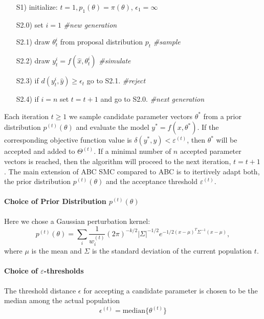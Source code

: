 \documentclass[10pt,letterpaper]{article}
\begin{document}
\begin{itemize}
\item[S1)] initialize: $t=1, p_{1}(\theta) = \pi(\theta)$, $\epsilon_{1} = \infty$
\item[S2.0)] set $i = 1$ \emph{\#new generation }
\item[S2.1)] draw $\theta_{t}^{i}$ from proposal distribution $p_{t}$ \emph{\#sample}
\item[S2.2)] draw $y_{t}^{i} = f(\hat{x}, \theta_{t}^{i})$ \emph{\#simulate}
\item[S2.3)] if $d( y_{t}^{i}, \hat{y}) \ge \epsilon_t$ go to S2.1. \emph{\#reject}
\item[S2.4)] if $i = n$ set $t=t+1$ and go to S2.0.  \emph{\#next generation}
\end{itemize}

Each iteration $t \ge 1$ we sample candidate parameter vectors $\theta^*$ from a prior distribution $p^{(t)}(\theta)$ and evaluate the model $y^{*} = f(x, \theta^*)$. If the corresponding  objective function value is $\delta(y^{*}, y) < \varepsilon^{(t)}$, then $\theta^*$ will be accepted and added to $\Theta^{(t)}$. If a minimal number of $n$ accepted parameter vectors is reached, then the algorithm will proceed to the next iteration, $t = t+1$. The main extension of ABC SMC compared to ABC is to itertively adapt both, the prior distribution $p^{(t)}(\theta)$ and the acceptance threshold $\varepsilon^{(t)}$.

\paragraph{Choice of Prior Distribution $p^{(t)}(\theta)$}
Here we chose a Gaussian perturbation kernel:
\begin{equation}
	p^{(t)}(\theta) = \sum_{i}\frac{1}{w^{(t)}_{i}} (2\pi)^{-k/2} |\Sigma|^{-1/2}e^{-1/2(x-\mu)^{T}\Sigma^{-1}(x-\mu)},
\end{equation}
where $\mu$ is the mean and $\Sigma$ is the standard deviation of the current population $t$.
\paragraph{Choice of $\varepsilon$-thresholds} The threshold distance $\epsilon$ for accepting a candidate parameter is chosen to be the median among the actual population 
\begin{equation}
	\epsilon^{(t)} = \text{median} \{ \theta^{(t)} \}
\end{equation}
\end{document}
